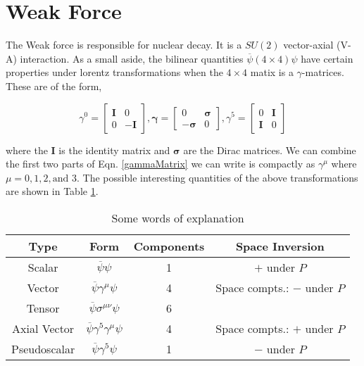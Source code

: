 \section{Weak Force}
\label{WeakForce}

The Weak force is responsible for nuclear decay. It is a $SU(2)$ vector-axial (V-A) interaction. As a small aside, the bilinear quantities $\overline{\psi}(4\times4)\psi$ have certain properties under lorentz transformations when the $4\times4$ matix is a $\gamma$-matrices. These are of the form,

\begin{equation} \label{gammaMatrix}
\gamma^0=
\begin{bmatrix}
\boldsymbol{I} & 0 \\
0 & -\boldsymbol{I}
\end{bmatrix},
\boldsymbol{\gamma}=
\begin{bmatrix}
0 & \boldsymbol{\sigma} \\
-\boldsymbol{\sigma} & 0
\end{bmatrix},
\gamma^5=
\begin{bmatrix}
0 & \boldsymbol{I} \\
\boldsymbol{I} & 0
\end{bmatrix}
\end{equation}

where the $\boldsymbol{I}$ is the identity matrix and $\boldsymbol{\sigma}$ are the Dirac matrices. We can combine the first two parts of Eqn. \ref{gammaMatrix} we can write is compactly as $\gamma^\mu$ where $\mu=0,1,2, \text{and }3$. The possible interesting quantities of the above transformations are shown in Table \ref{Transformations}.

\begin{table}
\centering
\begin{tabular}{|c|c|c|c|}
\hline
Type & Form & Components & Space Inversion \\
\hline
\hline
 Scalar &  $\overline{\psi}\psi$ &  1 & $+$ under $P$ \\
 Vector & $\overline{\psi}\gamma^\mu\psi$ & 4 & Space compts.: $-$ under $P$ \\
 Tensor & $\overline{\psi}\sigma^{\mu\nu}\psi$ & 6 &  \\
 Axial Vector & $\overline{\psi}\gamma^5\gamma^\mu\psi$ & 4 & Space compts.: $+$ under $P$ \\
 Pseudoscalar & $\overline{\psi}\gamma^5\psi$ & 1 & $-$ under $P$ \\
 \hline
\end{tabular}
\caption{Some words of explanation}
\label{Transformations}
\end{table}

